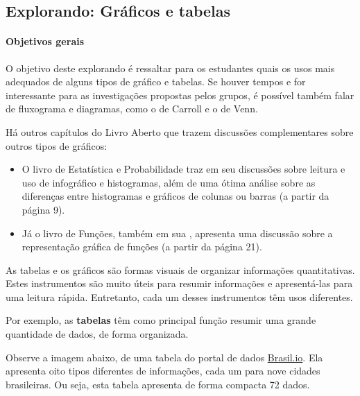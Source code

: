 \clearpage

\def\currentcolor{session1}
\begin{texto}
{
  \subsection{Explorando: Gráficos e tabelas}
  \paragraph{Objetivos gerais}

  O objetivo deste explorando é ressaltar para os estudantes quais os usos mais adequados de alguns tipos de gráfico e tabelas. Se houver tempos e for interessante para as investigações propostas pelos grupos, é possível também falar de fluxograma e diagramas, como o de Carroll e o de Venn.

  Há outros capítulos do Livro Aberto que trazem discussões complementares sobre outros tipos de gráficos:

  \begin{itemize}
  \item O livro de Estatística e Probabilidade traz em seu  discussões sobre leitura e uso de infográfico e histogramas, além de uma ótima análise sobre as diferenças entre histogramas e gráficos de colunas ou barras (a partir da página 9).
    
  \item Já o livro de Funções, também em sua , apresenta uma discussão sobre a representação gráfica de funções (a partir da página 21).
  \end{itemize}

}
\end{texto}

As tabelas e os gráficos são formas visuais de organizar informações quantitativas. Estes instrumentos são muito úteis para resumir informações e apresentá-las para uma leitura rápida. Entretanto, cada um desses instrumentos têm usos diferentes.

Por exemplo, as \textbf{tabelas} têm como principal função resumir uma grande quantidade de dados, de forma organizada.

Observe a imagem abaixo, de uma tabela do portal de dados \url{Brasil.io}. Ela apresenta oito tipos diferentes de informações, cada um para nove cidades brasileiras. Ou seja, esta tabela apresenta de forma compacta 72 dados.

